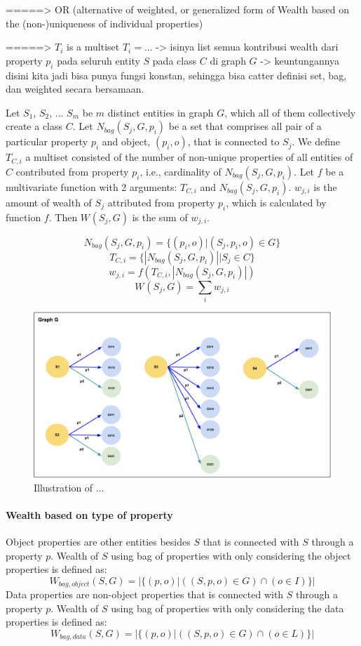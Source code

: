 \documentclass[
]{ceurart}
\begin{document}
=====> OR (alternative of weighted, or generalized form of Wealth based on the (non-)uniqueness of individual properties)

=====> \(T_i\) is a multiset \(T_i = ... \) -> isinya list semua kontribusi wealth dari property \(p_i\) pada seluruh entity \(S\) pada class \(C\) di graph \(G\) -> keuntungannya disini kita jadi bisa punya fungsi konstan, sehingga bisa catter definisi set, bag, dan weighted secara bersamaan.

Let \(S_1\), \(S_2\), ... \(S_m\) be \(m\) distinct entities in graph \(G\), which all of them collectively create a class \(C\). Let \(N_{bag}(S_j,G,p_i)\) be a set that comprises all pair of a particular property \(p_i\) and object, \((p_i,o)\), that is connected to \(S_j\). We define \(T_{C,i}\) a multiset consisted of the number of non-unique properties of all entities of \(C\) contributed from property \(p_i\), i.e., cardinality of \(N_{bag}(S_j,G,p_i)\). Let \(f\) be a multivariate function with 2 arguments: \(T_{C,i}\) and \(N_{bag}(S_j,G,p_i)\). \(w_{j,i}\) is the amount of wealth of \(S_j\) attributed from property \(p_i\), which is calculated by function \(f\). Then \(W_{}(S_j, G)\) is the sum of \(w_{j,i}\).


\[
    N_{bag}(S_j,G,p_i) = \{(p_i,o) | (S_j, p_i, o) \in G\}
\]
\[
    T_{C,i} = \{|N_{bag}(S_j,G,p_i)| | S_j \in C\}
\]
\[
    w_{j,i} = f(T_{C,i}, |N_{bag}(S_j,G,p_i)|)
\]
\[
    W_{}(S_j, G) = \sum_i w_{j,i}
\]

\begin{figure}
    \centering
    \includegraphics[scale=.3]{Wealth Weighted}
    \caption{Illustration of ...}
    \label{fig:wealth-weighted}
\end{figure}

\paragraph{Wealth based on type of property}
Object properties are other entities besides \(S\) that is connected with \(S\) through a property \(p\). Wealth of \(S\) using bag of properties with only considering the object properties is defined as:
\[
    W_{bag, object}(S, G) = |\{(p,o) | ((S, p, o) \in G) \cap (o \in I)\}|
\]
Data properties are non-object properties that is connected with \(S\) through a property \(p\). Wealth of \(S\) using bag of properties with only considering the data properties is defined as:
\[
    W_{bag, data}(S, G) = |\{(p,o) | ((S, p, o) \in G) \cap (o \in L)\}|
\]
\end{document}
